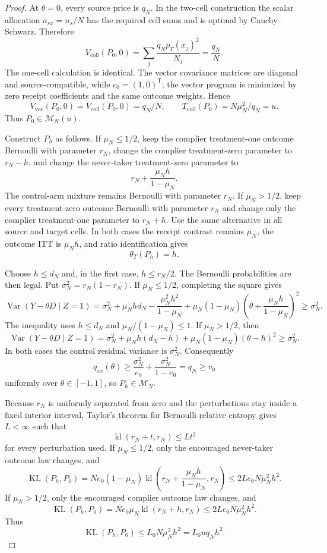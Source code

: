 \documentclass{article}
\begin{document}
\begin{proof}
At \(\theta=0\), every source price is \(q_N\). In the two-cell construction the scalar allocation \(a_{sx}=n_s/N\) has the required cell sums and is optimal by Cauchy--Schwarz. Therefore
\[
V_{\mathrm{coll}}(P_0,0)
=\sum_j\frac{q_Np_T(x_j)^2}{N_j}
=\frac{q_N}{N}.
\]
The one-cell calculation is identical. The vector covariance matrices are diagonal and source-compatible, while \(c_0=(1,0)^{\mathsf T}\); the vector program is minimized by zero receipt coefficients and the same outcome weights. Hence
\[
V_{\mathrm{vec}}(P_0,0)=V_{\mathrm{coll}}(P_0,0)=q_N/N,
\qquad
T_{\mathrm{coll}}(P_0)=N\mu_N^2/q_N=u.
\]
Thus \(P_0\in\mathcal M_N(u)\).

Construct \(P_h\) as follows. If \(\mu_N\le1/2\), keep the complier treatment-one outcome Bernoulli with parameter \(r_N\), change the complier treatment-zero parameter to \(r_N-h\), and change the never-taker treatment-zero parameter to
\[
r_N+\frac{\mu_Nh}{1-\mu_N}.
\]
The control-arm mixture remains Bernoulli with parameter \(r_N\). If \(\mu_N>1/2\), keep every treatment-zero outcome Bernoulli with parameter \(r_N\) and change only the complier treatment-one parameter to \(r_N+h\). Use the same alternative in all source and target cells. In both cases the receipt contrast remains \(\mu_N\), the outcome ITT is \(\mu_Nh\), and ratio identification gives
\[
\theta_T(P_h)=h.
\]

Choose \(h\le d_N\) and, in the first case, \(h\le r_N/2\). The Bernoulli probabilities are then legal. Put \(\sigma_N^2=r_N(1-r_N)\). If \(\mu_N\le1/2\), completing the square gives
\[
\operatorname{Var}(Y-\theta D\mid Z=1)
=\sigma_N^2+\mu_Nhd_N-\frac{\mu_N^2h^2}{1-\mu_N}
+\mu_N(1-\mu_N)
\left(\theta+\frac{\mu_Nh}{1-\mu_N}\right)^2
\ge\sigma_N^2.
\]
The inequality uses \(h\le d_N\) and \(\mu_N/(1-\mu_N)\le1\). If \(\mu_N>1/2\), then
\[
\operatorname{Var}(Y-\theta D\mid Z=1)
=\sigma_N^2+\mu_Nh(d_N-h)
+\mu_N(1-\mu_N)(\theta-h)^2
\ge\sigma_N^2.
\]
In both cases the control residual variance is \(\sigma_N^2\). Consequently
\[
q_{sx}(\theta)\ge
\frac{\sigma_N^2}{e_0}+\frac{\sigma_N^2}{1-e_0}
=q_N\ge v_0
\]
uniformly over \(\theta\in[-1,1]\), so \(P_h\in\mathcal M_N\).

Because \(r_N\) is uniformly separated from zero and the perturbations stay inside a fixed interior interval, Taylor's theorem for Bernoulli relative entropy gives \(L<\infty\) such that
\[
\operatorname{kl}(r_N+t,r_N)\le Lt^2
\]
for every perturbation used. If \(\mu_N\le1/2\), only the encouraged never-taker outcome law changes, and
\[
\operatorname{KL}(P_h,P_0)
=Ne_0(1-\mu_N)
\operatorname{kl}\left(r_N+\frac{\mu_Nh}{1-\mu_N},r_N\right)
\le2Le_0N\mu_N^2h^2.
\]
If \(\mu_N>1/2\), only the encouraged complier outcome law changes, and
\[
\operatorname{KL}(P_h,P_0)
=Ne_0\mu_N\operatorname{kl}(r_N+h,r_N)
\le2Le_0N\mu_N^2h^2.
\]
Thus
\[
\operatorname{KL}(P_h,P_0)\le L_0N\mu_N^2h^2=L_0uq_Nh^2.
\]


\end{proof}
\end{document}
